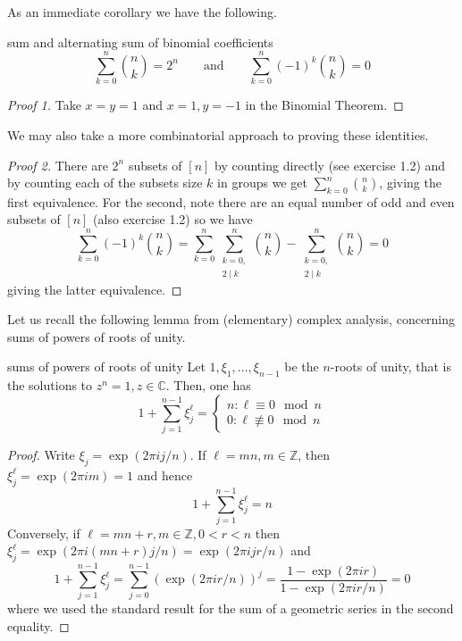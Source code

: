 \documentclass{article}
\begin{document}
As an immediate corollary we have the following.

\begin{corollary}[]{sum and alternating sum of binomial coefficients}
    \[\sum_{k=0}^n \binom{n}{k} = 2^n \qquad \text{and} \qquad \sum_{k=0}^n (-1)^k \binom{n}{k} = 0\]
\end{corollary}

\begin{proof}[Proof 1]
    Take $x=y=1$ and $x=1, y=-1$ in the Binomial Theorem. 
\end{proof}

We may also take a more combinatorial approach to proving these identities. 

\begin{proof}[Proof 2]
    There are $2^n$ subsets of $[n]$ by counting directly (see exercise 1.2) and by counting each of the subsets size $k$ in groups we get 
    $\sum_{k=0}^n \binom{n}{k}$, giving the first equivalence. For the second, note there are an equal number of odd and even subsets of $[n]$ 
    (also exercise 1.2) so we have 
    \[\sum_{k=0}^n (-1)^k \binom{n}{k} = \sum_{k=0}^n\sum_{\substack{k=0, \\ 2 \mid k}}^n \binom{n}{k} - \sum_{\substack{k=0, \\ 2 \mid k}}^{n} \binom{n}{k} = 0\]
    giving the latter equivalence.
\end{proof}

Let us recall the following lemma from (elementary) complex analysis, concerning sums of powers of roots of unity.

\begin{lemma}[]{sums of powers of roots of unity}
    Let $1, \xi_1, \dots, \xi_{n-1}$ be the $n$-roots of unity, that is the solutions to $z^n = 1, z \in \mathbb{C}$. Then, one has 
    \[1 + \sum_{j=1}^{n-1} \xi_j^\ell = \begin{cases}n : \ell \equiv 0 \mod n \\ 0 : \ell \not\equiv 0 \mod n\end{cases}\]
\end{lemma}

\begin{proof}
    Write $\xi_j = \exp(2\pi i j/n)$. If $\ell = mn, m \in \mathbb{Z}$, then $\xi_j^\ell = \exp(2\pi i m) = 1$ and hence
    \[1 + \sum_{j=1}^{n-1}\xi_j^\ell = n\] 
    Conversely, if $\ell = mn + r, m \in \mathbb{Z}, 0 < r < n$ then $\xi_j^\ell = \exp(2\pi i (mn+r)j/n) = \exp(2\pi i jr/n)$ and 
    \[1 + \sum_{j=1}^{n-1} \xi_j^\ell = \sum_{j=0}^{n-1}\left(\exp(2\pi i r/n)\right)^j = \frac{1 - \exp(2\pi i r)}{1 - \exp(2\pi i r/n)} = 0\]
    where we used the standard result for the sum of a geometric series in the second equality. 
\end{proof}
\end{document}
